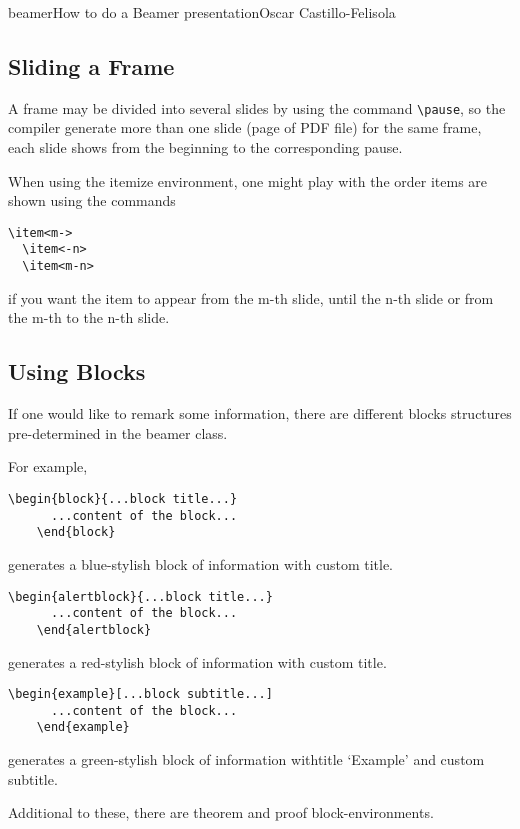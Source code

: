 \begin{article}[2]{beamer}{How to do a Beamer presentation}{Oscar Castillo-Felisola}
  \subsection{Sliding a Frame}

  A frame may be divided into several slides by using the command \lstinline[style=LaTeX]!\pause!, so the compiler generate more than one slide (page of PDF file) for the same frame, each slide shows from the beginning to the corresponding pause.

  When using the itemize environment, one might play with the order items are shown using the commands
  \begin{lstlisting}[style=LaTeX]
  \item<m->
  \item<-n>
  \item<m-n>
  \end{lstlisting}
  if you want the item to appear from the m-th slide, until the n-th slide or from the m-th to the n-th slide.

  \subsection{Using Blocks}

  If one would like to remark some information, there are different blocks structures pre-determined in the beamer class.

  For example,
  \begin{lstlisting}[style=LaTeX]
    \begin{block}{...block title...}
      ...content of the block...
    \end{block}
  \end{lstlisting}
  generates a blue-stylish  block of information with custom title.
  \begin{lstlisting}[style=LaTeX]
    \begin{alertblock}{...block title...}
      ...content of the block...
    \end{alertblock}
  \end{lstlisting}
  generates a red-stylish block of information with custom title.
  \begin{lstlisting}[style=LaTeX]
    \begin{example}[...block subtitle...]
      ...content of the block...
    \end{example}
  \end{lstlisting}
  generates a green-stylish block of information withtitle `Example’ and custom subtitle.

  Additional to these, there are theorem and proof block-environments.
\end{article}
